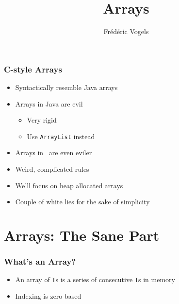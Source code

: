 \usepackage{ucll-code}

\usetikzlibrary{shadows,shapes.multipart}

\title{Arrays}
\author{Fr\'ed\'eric Vogels}




\begin{frame}
  \titlepage
\end{frame}

\begin{frame}
  \frametitle{C-style Arrays}
  \begin{itemize}
    \item Syntactically resemble Java arrays
    \item Arrays in Java are evil
          \begin{itemize}
            \item Very rigid
            \item Use {\tt ArrayList} instead
          \end{itemize}
    \item Arrays in \cpp\ are even eviler
    \item Weird, complicated rules
    \item We'll focus on heap allocated arrays
    \item Couple of white lies for the sake of simplicity
  \end{itemize}
\end{frame}

\section{Arrays: The Sane Part}

\frame{\tableofcontents[currentsection]}

\begin{frame}
  \frametitle{What's an Array?}
  \begin{center}
  \end{center}
  \begin{itemize}
    \item An array of \texttt{T}s is a series of consecutive \texttt{T}s in memory
    \item Indexing is zero based
  \end{itemize}
\end{frame}

